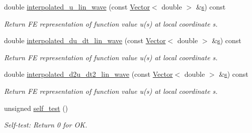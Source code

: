 \begin{DoxyCompactItemize}
double \hyperlink{classoomph_1_1LinearWaveEquations_ac05d4cc1db9dd20b8e6975e5d6ccd530}{interpolated\+\_\+u\+\_\+lin\+\_\+wave} (const \hyperlink{classoomph_1_1Vector}{Vector}$<$ double $>$ \&\hyperlink{cfortran_8h_ab7123126e4885ef647dd9c6e3807a21c}{s}) const
\begin{DoxyCompactList}\small\item\em Return FE representation of function value u(s) at local coordinate s. \end{DoxyCompactList}\item 
double \hyperlink{classoomph_1_1LinearWaveEquations_a79c7bb4d574bffa81227fa93bc08fb4b}{interpolated\+\_\+du\+\_\+dt\+\_\+lin\+\_\+wave} (const \hyperlink{classoomph_1_1Vector}{Vector}$<$ double $>$ \&\hyperlink{cfortran_8h_ab7123126e4885ef647dd9c6e3807a21c}{s}) const
\begin{DoxyCompactList}\small\item\em Return FE representation of function value u(s) at local coordinate s. \end{DoxyCompactList}\item 
double \hyperlink{classoomph_1_1LinearWaveEquations_a86abe5e3b3473823368cb81f6f749707}{interpolated\+\_\+d2u\+\_\+dt2\+\_\+lin\+\_\+wave} (const \hyperlink{classoomph_1_1Vector}{Vector}$<$ double $>$ \&\hyperlink{cfortran_8h_ab7123126e4885ef647dd9c6e3807a21c}{s}) const
\begin{DoxyCompactList}\small\item\em Return FE representation of function value u(s) at local coordinate s. \end{DoxyCompactList}\item 
unsigned \hyperlink{classoomph_1_1LinearWaveEquations_a2e4ced01331ace59c6d8fe95a756ca73}{self\+\_\+test} ()
\begin{DoxyCompactList}\small\item\em Self-\/test\+: Return 0 for OK. \end{DoxyCompactList}\end{DoxyCompactItemize}

